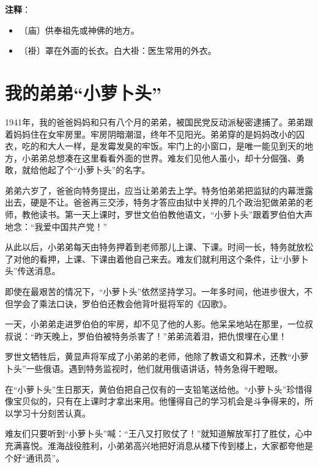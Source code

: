\documentclass[12pt,UTF-8,openany]{ctexbook}
\begin{document}
\textbf{注释}：

\vspace{-1em}

\begin{itemize}
    \setlength\itemsep{-0.2em}
    \item 〔庙〕供奉祖先或神佛的地方。
    \item 〔褂〕罩在外面的长衣。白大褂：医生常用的外衣。
\end{itemize}

\chapter{我的弟弟“小萝卜头”}

\begin{Large}
    
    1941年，我的爸爸妈妈和只有八个月的弟弟，被国民党反动派秘密逮捕了。弟弟跟着妈妈住在女牢房里。牢房阴暗潮湿，终年不见阳光。弟弟穿的是妈妈改小的囚衣，吃的和大人一样，是发霉发臭的牢饭。牢门上的小窗口，是唯一能见到天的地方，小弟弟总想凑在这里看看外面的世界。难友们见他人虽小，却十分倔强、勇敢，就给他起了个“小萝卜头”的名字。
    
    弟弟六岁了，爸爸向特务提出，应当让弟弟去上学。特务怕弟弟把监狱的内幕泄露出去，硬是不让。爸爸再三交涉，特务才答应由狱中关押的几个政治犯做弟弟的老师，教他读书。第一天上课时，罗世文伯伯教他语文，“小萝卜头”跟着罗伯伯大声地念：“我爱中国共产党！”
    
    从此以后，小弟弟每天由特务押着到老师那儿上课、下课。时间一长，特务就放松了对他的看押，上课、下课由着他自己来去。难友们就利用这个条件，让“小萝卜头”传送消息。
    
    即使在最艰苦的情况下，“小萝卜头”依然坚持学习。一年多时间，他进步很大，不但学会了乘法口诀，罗伯伯还教会他背叶挺将军的《囚歌》。
    
    一天，小弟弟走进罗伯伯的牢房，却不见了他的人影。他呆呆地站在那里，一位叔叔说：“昨天晚上，罗伯伯被特务杀害了！”弟弟流着泪，把仇恨埋在心里！
    
    罗世文牺牲后，黄显声将军成了小弟弟的老师，他除了教语文和算术，还教“小萝卜头”一些俄语。遇到特务监视时，他们就用俄语讲话，特务急得干瞪眼。
    
    在“小萝卜头”生日那天，黄伯伯把自己仅有的一支铅笔送给他。“小萝卜头”珍惜得像宝贝似的，只有在上课时才拿出来用。他懂得自己的学习机会是斗争得来的，所以学习十分刻苦认真。
    
    难友们只要听到“小萝卜头”喊：“王八又打败仗了！”就知道解放军打了胜仗，心中充满喜悦。淮海战役胜利，小弟弟高兴地把好消息从楼下传到楼上，大家都夸他是个好“通讯员”。
    
\end{Large}
\end{document}
